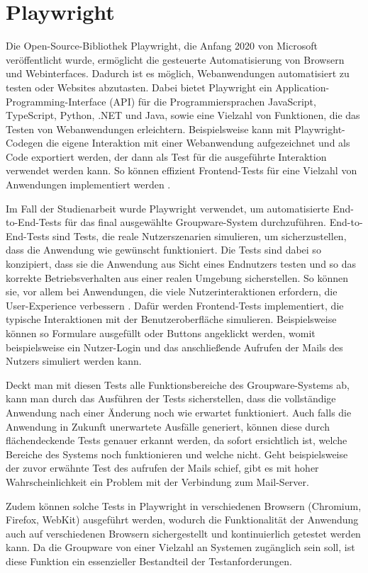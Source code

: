 \section{Playwright}

Die Open-Source-Bibliothek Playwright, die Anfang 2020 von Microsoft veröffentlicht wurde, ermöglicht die gesteuerte Automatisierung von Browsern und Webinterfaces. Dadurch ist es möglich, Webanwendungen automatisiert zu testen oder Websites abzutasten.
Dabei bietet Playwright ein Application-Programming-Interface (API) für die Programmiersprachen JavaScript, TypeScript, Python, .NET und Java, sowie eine Vielzahl von Funktionen, die das Testen von Webanwendungen erleichtern.
Beispielsweise kann mit Playwright-Codegen die eigene Interaktion mit einer Webanwendung aufgezeichnet und als Code exportiert werden, der dann als Test für die ausgeführte Interaktion verwendet werden kann.
So können effizient Frontend-Tests für eine Vielzahl von Anwendungen implementiert werden \autocite[][]{playwright}.

Im Fall der Studienarbeit wurde Playwright verwendet, um automatisierte End-to-End-Tests für das final ausgewählte Groupware-System durchzuführen.
End-to-End-Tests sind Tests, die reale Nutzerszenarien simulieren, um sicherzustellen, dass die Anwendung wie gewünscht funktioniert.
Die Tests sind dabei so konzipiert, dass sie die Anwendung aus Sicht eines Endnutzers testen und so das korrekte Betriebsverhalten aus einer realen Umgebung sicherstellen.
So können sie, vor allem bei Anwendungen, die viele Nutzerinteraktionen erfordern, die User-Experience verbessern \autocite[vgl.][]{e2e-blog}.
Dafür werden Frontend-Tests implementiert, die typische Interaktionen mit der Benutzeroberfläche simulieren.
Beispielsweise können so Formulare ausgefüllt oder Buttons angeklickt werden, womit beispielsweise ein Nutzer-Login und das anschließende Aufrufen der Mails des Nutzers simuliert werden kann.

Deckt man mit diesen Tests alle Funktionsbereiche des Groupware-Systems ab, kann man durch das Ausführen der Tests sicherstellen, dass die vollständige Anwendung nach einer Änderung noch wie erwartet funktioniert.
Auch falls die Anwendung in Zukunft unerwartete Ausfälle generiert, können diese durch flächendeckende Tests genauer erkannt werden, da sofort ersichtlich ist, welche Bereiche des Systems noch funktionieren und welche nicht.
Geht beispielsweise der zuvor erwähnte Test des aufrufen der Mails schief, gibt es mit hoher Wahrscheinlichkeit ein Problem mit der Verbindung zum Mail-Server.

Zudem können solche Tests in Playwright in verschiedenen Browsern (Chromium, Firefox, WebKit) ausgeführt werden, wodurch die Funktionalität der Anwendung auch auf verschiedenen Browsern sichergestellt und kontinuierlich getestet werden kann.
Da die Groupware von einer Vielzahl an Systemen zugänglich sein soll, ist diese Funktion ein essenzieller Bestandteil der Testanforderungen.







